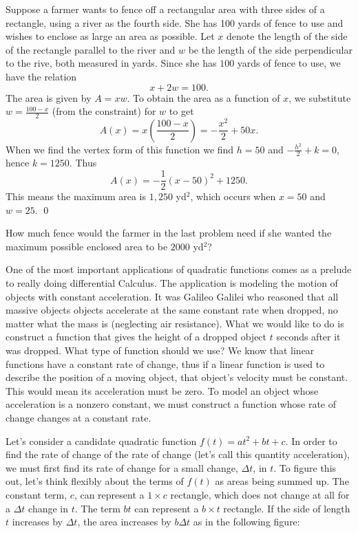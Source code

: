 \begin{eg} Suppose a farmer wants to fence off a rectangular area with three sides of a rectangle, using a river as the fourth side. She has 100 yards of fence to use and wishes to enclose as large an area as possible. Let $x$ denote the length of the side of the rectangle parallel to the river and $w$ be the length of the side perpendicular to the rive, both measured in yards. Since she has $100$ yards of fence to use, we have the relation
\[
x+2w = 100.
\]
The area is given by $A = xw$. To obtain the area as a function of $x$, we substitute $w=\frac{100-x}{2}$ (from the constraint) for $w$ to get
\[
A(x) = x\left(\frac{100-x}{2}\right) = -\frac{x^2}{2}+50x.
\]
When we find the vertex form of this function we find $h=50$ and $-\frac{h^2}{2} + k = 0$, hence $k = 1250$. Thus
\[
A(x) = -\frac{1}{2}(x-50)^2 + 1250.
\]
This means the maximum area is $1,250$ yd${^2}$, which occurs when $x=50$ and $w = 25$. \qed \end{eg}

\par

\begin{question} How much fence would the farmer in the last problem need if she wanted the maximum possible enclosed area to be $2000$ yd$^2$?
\end{question}

\par

One of the most important applications of quadratic functions comes as a prelude to really doing differential Calculus. The application is modeling the motion of objects with constant acceleration. It was Galileo Galilei who reasoned that all massive objects objects accelerate at the same constant rate when dropped, no matter what the mass is (neglecting air resistance). What we would like to do is construct a function that gives the height of a dropped object $t$ seconds after it was dropped. What type of function should we use? We know that linear functions have a constant rate of change, thus if a linear function is used to describe the position of a moving object, that object's velocity must be constant. This would mean its acceleration must be zero. To model an object whose acceleration is a nonzero constant, we must construct a function whose rate of change changes at a constant rate.    

\par

Let's consider a candidate quadratic function $f(t) = at^2+bt+c$. In order to find the rate of change of the rate of change (let's call this quantity acceleration), we must first find its rate of change for a small change, $\Delta t$, in $t$. To figure this out, let's think flexibly about the terms of $f(t)$ as areas being summed up. The constant term, $c$, can represent a $1\times c$ rectangle, which does not change at all for a $\Delta t$ change in $t$. The term $bt$ can represent a $b\times t$ rectangle. If the side of length $t$ increases by $\Delta t$, the area increases by $b\Delta t$ as in the following figure:\\

